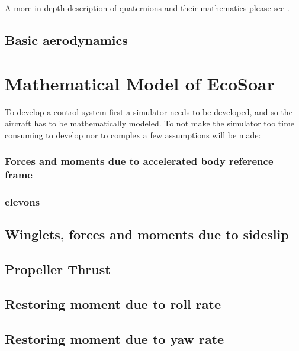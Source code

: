 \documentclass{article}
\begin{document}
A more in depth description of quaternions and their mathematics please see \cite{Sola2016}.



\subsection {Basic aerodynamics}


\section{Mathematical Model of EcoSoar}
To develop a control system first a simulator needs to be developed, and so the aircraft has to be mathematically modeled.
To not make the simulator too time consuming to develop nor to complex a few assumptions will be made:


%



\subsubsection{Forces and moments due to accelerated body reference frame}



\subsubsection{elevons}


\subsection{Winglets, forces and moments due to sideslip}


\subsection{Propeller Thrust}


\subsection{Restoring moment due to roll rate}


\subsection{Restoring moment due to yaw rate}

\end{document}
